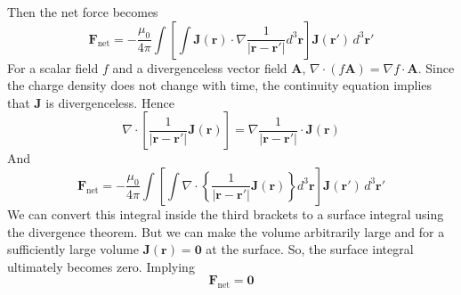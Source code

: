 \documentclass[titlepage, a4paper, 11pt]{article}
\begin{document}
Then the net force becomes
\begin{equation}
	\mathbf{F}_\text{net} = - \frac{\mu_0}{4\pi} \int \left[ \int \mathbf{J}(\mathbf{r}) \cdot
	\nabla \frac{1}{|\mathbf{r} - \mathbf{r}'|} d^3\mathbf{r} \right] \mathbf{J}(\mathbf{r}') \,
	d^3\mathbf{r}'
\end{equation}
For a scalar field $f$ and a divergenceless vector field $\mathbf{A}$, $\nabla \cdot (f \mathbf{A})
= \nabla f \cdot \mathbf{A}$. Since the charge density does not change with time, the continuity
equation\cite{Griffiths} implies that $\mathbf{J}$ is divergenceless. Hence
\begin{equation}
	\nabla \cdot \left[ \frac{1}{|\mathbf{r} - \mathbf{r}'|} \mathbf{J}(\mathbf{r}) \right] = \nabla
	\frac{1}{|\mathbf{r} - \mathbf{r}'|} \cdot \mathbf{J}(\mathbf{r})
	\label{div 1/|r-r'| J}
\end{equation}
And
\begin{equation}
	\mathbf{F}_\text{net} = - \frac{\mu_0}{4\pi} \int \left[ \int \nabla \cdot \left\{
	\frac{1}{|\mathbf{r} - \mathbf{r}'|} \mathbf{J}(\mathbf{r}) \right\} d^3\mathbf{r} \right]
	\mathbf{J}(\mathbf{r}') \, d^3\mathbf{r}'
\end{equation}
We can convert this integral inside the third brackets to a surface integral using the divergence
theorem. But we can make the volume arbitrarily large and for a sufficiently large volume
$\mathbf{J}(\mathbf{r}) = \mathbf{0}$ at the surface. So, the surface integral ultimately becomes
zero. Implying
\begin{equation}
	\mathbf{F}_\text{net} = \mathbf{0}
\end{equation}
\end{document}
